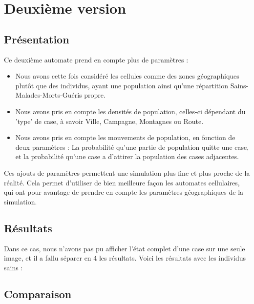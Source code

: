 \documentclass{article}
\begin{document}
	
	
\section{Deuxième version}

\subsection{Présentation}
	Ce deuxième automate prend en compte plus de paramètres : 
	\begin{itemize}
	\item Nous avons cette fois considéré les cellules comme des zones géographiques plutôt que des individus, ayant une population ainsi qu'une répartition Sains-Malades-Morts-Guéris propre.
	\item Nous avons pris en compte les densités de population, celles-ci dépendant du 'type' de case, à savoir Ville, Campagne, Montagnes ou Route.
	\item Nous avons pris en compte les mouvements de population, en fonction de deux paramètres : La probabilité qu'une partie de population quitte une case, et la probabilité qu'une case a d'attirer la population des cases adjacentes.
	\end{itemize}
	
	Ces ajouts de paramètres permettent une simulation plus fine et plus proche de la réalité. Cela permet d'utiliser de bien meilleure façon les automates cellulaires, qui ont pour avantage de prendre en compte les paramètres géographiques de la simulation.


\subsection{Résultats}

Dans ce cas, nous n'avons pas pu afficher l'état complet d'une case sur une seule image, et il a fallu séparer en 4 les résultats. Voici les résultats avec les individus sains : \\[0.6cm]


\subsection{Comparaison}

\nocite{*}


\end{document}
